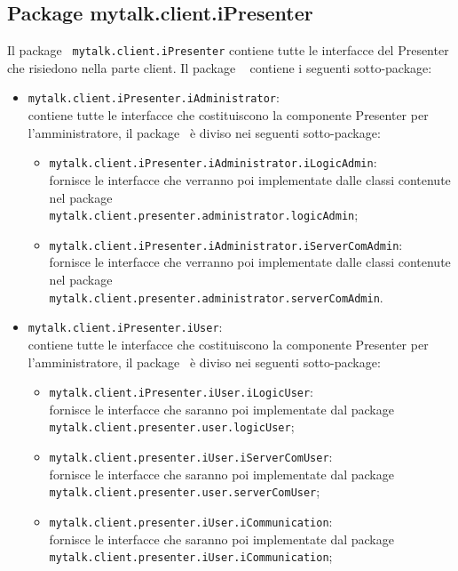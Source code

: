 	
	
\subsection{Package mytalk.client.iPresenter}
Il package\g~ \texttt{mytalk.client.iPresenter} contiene tutte le interfacce del Presenter che risiedono nella parte client\g . Il package \g~ contiene i seguenti sotto-package\g:

\begin{itemize}
	\item \texttt{mytalk.client.iPresenter.iAdministrator}: \\contiene tutte le interfacce che costituiscono la componente Presenter per l'amministratore, il package\g~ è diviso nei seguenti sotto-package\g:
		\begin{itemize}
			\item \texttt{mytalk.client.iPresenter.iAdministrator.iLogicAdmin}: \\fornisce le interfacce che verranno poi implementate dalle classi contenute nel package\g \\ \texttt{mytalk.client.presenter.administrator.logicAdmin};
			\item \texttt{mytalk.client.iPresenter.iAdministrator.iServerComAdmin}: \\fornisce le interfacce che verranno poi implementate dalle classi contenute nel package\g \\ \texttt{mytalk.client.presenter.administrator.serverComAdmin}.
		\end{itemize} 
	\item \texttt{mytalk.client.iPresenter.iUser}: \\contiene tutte le interfacce che costituiscono la componente Presenter per l'amministratore, il package\g~ è diviso nei seguenti sotto-package\g:
		\begin{itemize}
			\item \texttt{mytalk.client.iPresenter.iUser.iLogicUser}:\\ fornisce le interfacce che saranno poi implementate dal package\g~ \\ \texttt{mytalk.client.presenter.user.logicUser};
			\item \texttt{mytalk.client.presenter.iUser.iServerComUser}:\\ fornisce le interfacce che saranno poi implementate dal package\g~ \\ \texttt{mytalk.client.presenter.user.serverComUser};
			\item \texttt{mytalk.client.presenter.iUser.iCommunication}:\\ fornisce le interfacce che saranno poi implementate dal package\g~ \\ \texttt{mytalk.client.presenter.iUser.iCommunication};
		\end{itemize} 
	\end{itemize}	
	
